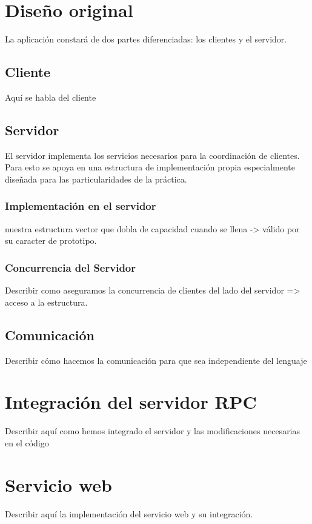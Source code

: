\documentclass[]{article}
\begin{document}
\section{Diseño original}
\label{sec:disenno}
La aplicación constará de dos partes diferenciadas: los clientes y el servidor.

\subsection{Cliente}
\label{subsec:cliente}
Aquí se habla del cliente 


\subsection{Servidor}
\label{subsec:servidor}
El servidor implementa los servicios necesarios para la coordinación de clientes. Para esto se apoya en una estructura de implementación propia especialmente diseñada para las particularidades de la práctica. 

\subsubsection{Implementación en el servidor}
\label{subsec:implementacion_servidor}
nuestra estructura vector que dobla de capacidad cuando se llena -> válido por su caracter de prototipo. 

\subsubsection{Concurrencia del Servidor}
\label{subsec::concurrencia_servidor}
Describir como aseguramos la concurrencia de clientes del lado del servidor => acceso a la estructura. 

\subsection{Comunicación}
\label{subsec:comunicacion}
Describir cómo hacemos la comunicación para que sea independiente del lenguaje 

\section{Integración del servidor RPC}
\label{sec:rpc}
Describir aquí como hemos integrado el servidor y las modificaciones necesarias en el código 

\section{Servicio web}
\label{sec:web_service}
Describir aquí la implementación del servicio web y su integración.  
\end{document}
